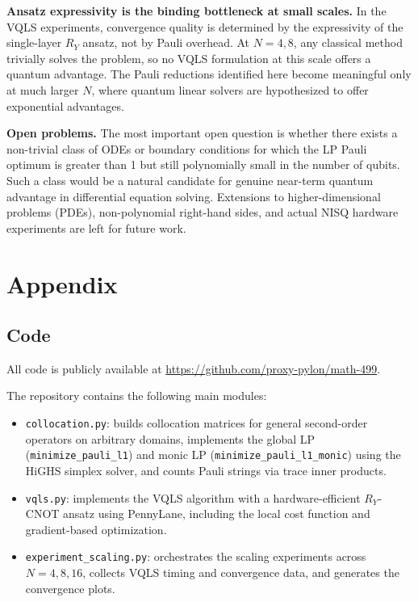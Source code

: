 \documentclass[a4paper,12pt]{amsart}
\begin{document}
\textbf{Ansatz expressivity is the binding bottleneck at small scales.} In the VQLS experiments, convergence quality is determined by the expressivity of the single-layer $R_Y$ ansatz, not by Pauli overhead. At $N=4,8$, any classical method trivially solves the problem, so no VQLS formulation at this scale offers a quantum advantage. The Pauli reductions identified here become meaningful only at much larger $N$, where quantum linear solvers are hypothesized to offer exponential advantages.

\textbf{Open problems.} The most important open question is whether there exists a non-trivial class of ODEs or boundary conditions for which the LP Pauli optimum is greater than 1 but still polynomially small in the number of qubits. Such a class would be a natural candidate for genuine near-term quantum advantage in differential equation solving. Extensions to higher-dimensional problems (PDEs), non-polynomial right-hand sides, and actual NISQ hardware experiments are left for future work.

\section{Appendix}

\subsection*{Code}
All code is publicly available at \url{https://github.com/proxy-pylon/math-499}.

The repository contains the following main modules:
\begin{itemize}
    \item \texttt{collocation.py}: builds collocation matrices for general second-order operators on arbitrary domains, implements the global LP (\texttt{minimize\_pauli\_l1}) and monic LP (\texttt{minimize\_pauli\_l1\_monic}) using the HiGHS simplex solver, and counts Pauli strings via trace inner products.
    \item \texttt{vqls.py}: implements the VQLS algorithm with a hardware-efficient $R_Y$-CNOT ansatz using PennyLane, including the local cost function and gradient-based optimization.
    \item \texttt{experiment\_scaling.py}: orchestrates the scaling experiments across $N=4,8,16$, collects VQLS timing and convergence data, and generates the convergence plots.
\end{itemize}
\end{document}
